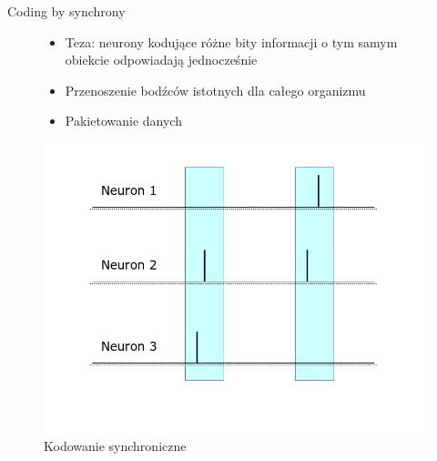\documentclass{beamer}
\begin{document}
\begin{frame}{Coding by synchrony}
	\begin{figure}[ht]
		\begin{minipage}{0.48\linewidth}
			\begin{itemize}
				\item Teza: neurony kodujące różne bity informacji o tym samym obiekcie odpowiadają jednocześnie
				\item Przenoszenie bodźców istotnych dla całego organizmu
				\item Pakietowanie danych
			\end{itemize}
		\end{minipage}
		\hfill
		\begin{minipage}{0.48\linewidth}
		\centering
		\includegraphics[width=\textwidth]{CodingBySynchrony.png}
		\caption{Kodowanie synchroniczne}
		\end{minipage}
	\end{figure}
\end{frame}
\end{document}
